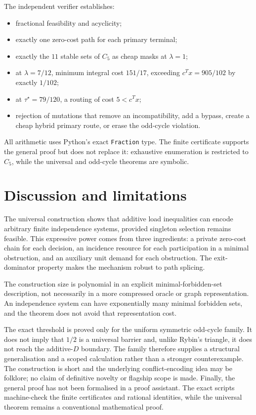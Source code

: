 \documentclass[11pt]{article}
\theoremstyle{definition}
\begin{document}
The independent verifier establishes:
\begin{itemize}
  \item fractional feasibility and acyclicity;
  \item exactly one zero-cost path for each primary terminal;
  \item exactly the \(11\) stable sets of \(C_5\) as cheap masks at \(\lambda=1\);
  \item at \(\lambda=7/12\), minimum integral cost \(151/17\), exceeding \(c^Tx=905/102\) by exactly \(1/102\);
  \item at \(\tau^\star=79/120\), a routing of cost \(5<c^Tx\);
  \item rejection of mutations that remove an incompatibility, add a bypass, create a cheap hybrid primary route, or erase the odd-cycle violation.
\end{itemize}

All arithmetic uses Python's exact \texttt{Fraction} type. The finite certificate supports the general proof but does not replace it: exhaustive enumeration is restricted to \(C_5\), while the universal and odd-cycle theorems are symbolic.

\section{Discussion and limitations}

The universal construction shows that additive load inequalities can encode arbitrary finite independence systems, provided singleton selection remains feasible. This expressive power comes from three ingredients: a private zero-cost chain for each decision, an incidence resource for each participation in a minimal obstruction, and an auxiliary unit demand for each obstruction. The exit-dominator property makes the mechanism robust to path splicing.

The construction size is polynomial in an explicit minimal-forbidden-set description, not necessarily in a more compressed oracle or graph representation. An independence system can have exponentially many minimal forbidden sets, and the theorem does not avoid that representation cost.

The exact threshold is proved only for the uniform symmetric odd-cycle family. It does not imply that \(1/2\) is a universal barrier and, unlike Rybin's triangle, it does not reach the additive-\(D\) boundary. The family therefore supplies a structural generalisation and a scoped calculation rather than a stronger counterexample. The construction is short and the underlying conflict-encoding idea may be folklore; no claim of definitive novelty or flagship scope is made. Finally, the general proof has not been formalised in a proof assistant. The exact scripts machine-check the finite certificates and rational identities, while the universal theorem remains a conventional mathematical proof.
\end{document}
